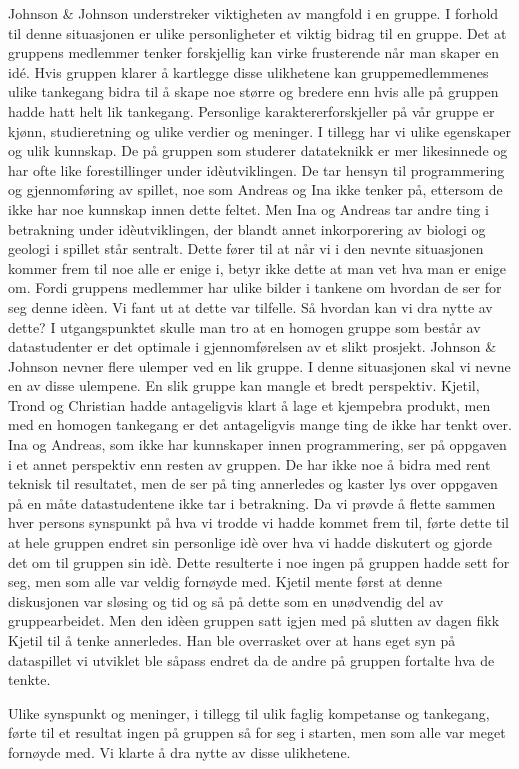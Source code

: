 Johnson \& Johnson  \cite{Johnson} understreker viktigheten av mangfold i en gruppe. I forhold til denne situasjonen er ulike personligheter et viktig bidrag til en gruppe. Det at gruppens medlemmer tenker forskjellig kan virke frusterende når man skaper en idé. Hvis gruppen klarer å kartlegge disse ulikhetene kan gruppemedlemmenes ulike tankegang bidra til å skape noe større og bredere enn hvis alle på gruppen hadde hatt helt lik tankegang. Personlige karaktererforskjeller på vår gruppe er kjønn, studieretning og ulike verdier og meninger. I tillegg har vi ulike egenskaper og ulik kunnskap. De på gruppen som studerer datateknikk er mer likesinnede og har ofte like forestillinger under idèutviklingen. De tar hensyn til programmering og gjennomføring av spillet, noe som Andreas og Ina ikke tenker på, ettersom de ikke har noe kunnskap innen dette feltet. Men Ina og Andreas tar andre ting i betrakning under idèutviklingen, der blandt annet inkorporering av biologi og geologi i spillet står sentralt. Dette fører til at når vi i den nevnte situasjonen kommer frem til noe alle er enige i, betyr ikke dette at man vet hva man er enige om. Fordi gruppens medlemmer har ulike bilder i tankene om hvordan de ser for seg denne idèen. Vi fant ut at dette var tilfelle. Så hvordan kan vi dra nytte av dette? 
I utgangspunktet skulle man tro at en homogen gruppe som består av datastudenter er det optimale i gjennomførelsen av et slikt prosjekt. Johnson \& Johnson nevner flere ulemper ved en lik gruppe. I denne situasjonen skal vi nevne en av disse ulempene. En slik gruppe kan  mangle et bredt perspektiv. Kjetil, Trond og Christian hadde antageligvis klart å lage et kjempebra produkt, men med en homogen tankegang er det antageligvis mange ting de ikke har tenkt over. Ina og Andreas, som ikke har kunnskaper innen programmering, ser på oppgaven i et annet perspektiv enn resten av gruppen. De har ikke noe å bidra med rent teknisk til resultatet, men de ser på ting annerledes og kaster lys over oppgaven på en måte datastudentene ikke tar i betrakning. Da vi prøvde å flette sammen hver persons synspunkt på hva vi trodde vi hadde kommet frem til, førte dette til at hele gruppen endret sin personlige idè over hva vi hadde diskutert og gjorde det om til gruppen sin idè. Dette resulterte i noe ingen på gruppen hadde sett for seg, men som alle var veldig fornøyde med.
Kjetil mente først at denne diskusjonen var sløsing og tid og så på dette som en unødvendig del av gruppearbeidet. Men den idèen gruppen satt igjen med på slutten av dagen fikk Kjetil til å tenke annerledes. Han ble overrasket over at hans eget syn på dataspillet vi utviklet ble såpass endret da de andre på gruppen fortalte hva de tenkte. 

Ulike synspunkt og meninger, i tillegg til ulik faglig kompetanse og tankegang, førte til et resultat ingen på gruppen så for seg i starten, men som alle var meget fornøyde med. Vi klarte å dra nytte av disse ulikhetene.